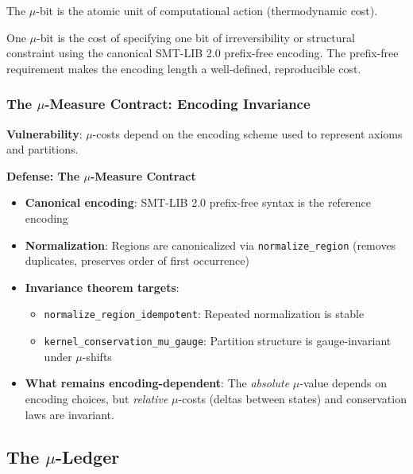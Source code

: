 The $\mu$-bit is the atomic unit of computational action (thermodynamic cost).

\begin{definition}[$\mu$-bit]
One $\mu$-bit is the cost of specifying one bit of irreversibility or structural constraint using the canonical SMT-LIB 2.0 prefix-free encoding. The prefix-free requirement makes the encoding length a well-defined, reproducible cost.
\end{definition}

\subsubsection{The $\mu$-Measure Contract: Encoding Invariance}

\begin{tcolorbox}[colback=yellow!10!white,colframe=orange!75!black,title=\textbf{Encoding Dependence and Invariance}]
\textbf{Vulnerability}: $\mu$-costs depend on the encoding scheme used to represent axioms and partitions.

\textbf{Defense: The $\mu$-Measure Contract}
\begin{itemize}
    \item \textbf{Canonical encoding}: SMT-LIB 2.0 prefix-free syntax is the reference encoding
    \item \textbf{Normalization}: Regions are canonicalized via \texttt{normalize\_region} (removes duplicates, preserves order of first occurrence)
    \item \textbf{Invariance theorem targets}:
    \begin{itemize}
        \item \texttt{normalize\_region\_idempotent}: Repeated normalization is stable
        \item \texttt{kernel\_conservation\_mu\_gauge}: Partition structure is gauge-invariant under $\mu$-shifts
    \end{itemize}
    \item \textbf{What remains encoding-dependent}: The \emph{absolute} $\mu$-value depends on encoding choices, but \emph{relative} $\mu$-costs (deltas between states) and conservation laws are invariant.
\end{itemize}
\end{tcolorbox}

\subsection{The $\mu$-Ledger}

